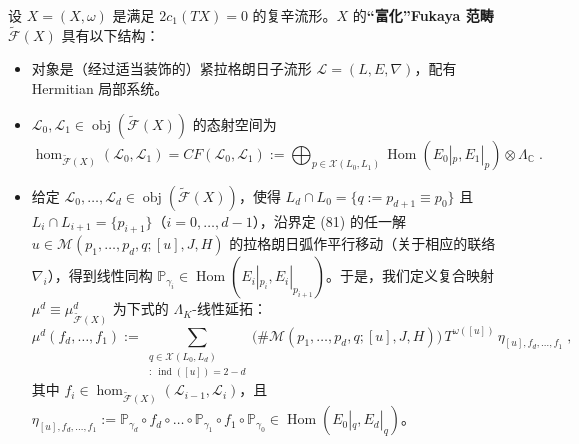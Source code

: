 \begin{Def}\label{def:7.25}
设 $X=(X,\omega)$ 是满足 $2c_1(TX)=0$ 的复辛流形。$X$ 的\textbf{“富化”Fukaya 范畴} $\widetilde{\mathcal F}(X)$ 具有以下结构：
\begin{itemize}
  \item 对象是（经过适当装饰的）紧拉格朗日子流形 $\mathcal L=(L,E,\nabla)$，配有 Hermitian 局部系统。
  \item $\mathcal L_0,\mathcal L_1\in\operatorname{obj}(\widetilde{\mathcal F}(X))$ 的态射空间为
  \begin{equation}\label{eq:7.112}
  \hom_{\widetilde{\mathcal F}(X)}(\mathcal L_0,\mathcal L_1)=CF(\mathcal L_0,\mathcal L_1):=\bigoplus_{p\in\mathcal X(L_0,L_1)}\operatorname{Hom}(E_0|_p,E_1|_p)\otimes\Lambda_{\mathbb C}\;.
  \end{equation}
  \item 给定 $\mathcal L_0,\dots,\mathcal L_d\in\operatorname{obj}(\widetilde{\mathcal F}(X))$，使得 $L_d\cap L_0=\{q:=p_{d+1}\equiv p_0\}$ 且 $L_i\cap L_{i+1}=\{p_{i+1}\}$（$i=0,\dots,d-1$），沿界定 (81) 的任一解 $u\in\mathcal M(p_1,\dots,p_d,q;[u],J,H)$ 的拉格朗日弧作平行移动（关于相应的联络 $\nabla_i$），得到线性同构 $\mathbb P_{\gamma_i}\in\operatorname{Hom}(E_i|_{p_i},E_i|_{p_{i+1}})$。于是，我们定义复合映射 $\mu^d\equiv\mu^d_{\widetilde{\mathcal F}(X)}$ 为下式的 $\Lambda_K$-线性延拓：
  \begin{equation}\label{eq:7.113}
  \mu^d(f_d,\dots,f_1):=\sum_{\substack{q\in\mathcal X(L_0,L_d)\\ [u]:\ \operatorname{ind}([u])=2-d}}\bigl(\#\mathcal M(p_1,\dots,p_d,q;[u],J,H)\bigr)\,T^{\omega([u])}\,\eta_{[u],f_d,\dots,f_1}\;,
  \end{equation}
  其中 $f_i\in\hom_{\widetilde{\mathcal F}(X)}(\mathcal L_{i-1},\mathcal L_i)$，且 $\eta_{[u],f_d,\dots,f_1}:=\mathbb P_{\gamma_d}\circ f_d\circ\dots\circ\mathbb P_{\gamma_1}\circ f_1\circ\mathbb P_{\gamma_0}\in\operatorname{Hom}(E_0|_q,E_d|_q)$。
\end{itemize}
\end{Def}

